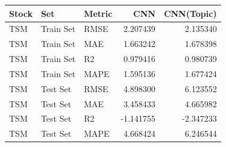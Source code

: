\begin{tabular}{lllrr}
\toprule
Stock & Set & Metric & CNN & CNN(Topic) \\
\midrule
TSM & Train Set & RMSE & 2.207439 & 2.135340 \\
TSM & Train Set & MAE & 1.663242 & 1.678398 \\
TSM & Train Set & R2 & 0.979416 & 0.980739 \\
TSM & Train Set & MAPE & 1.595136 & 1.677424 \\
TSM & Test Set & RMSE & 4.898300 & 6.123552 \\
TSM & Test Set & MAE & 3.458433 & 4.665982 \\
TSM & Test Set & R2 & -1.141755 & -2.347233 \\
TSM & Test Set & MAPE & 4.668424 & 6.246544 \\
\bottomrule
\end{tabular}
